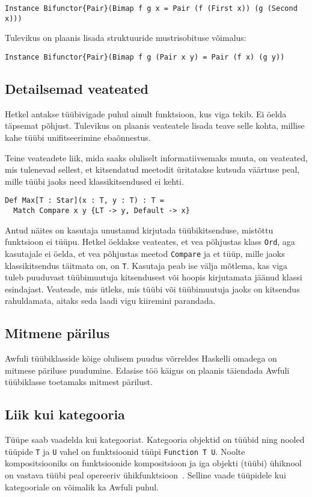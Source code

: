 \documentclass[12pt]{article}
\begin{document}
      \begin{verbatim}Instance Bifunctor{Pair}(Bimap f g x = Pair (f (First x)) (g (Second x)))\end{verbatim}

      Tulevikus on plaanis lisada struktuuride mustrisobituse võimalus:

      \begin{verbatim}Instance Bifunctor{Pair}(Bimap f g (Pair x y) = Pair (f x) (g y))\end{verbatim}
    \subsection{Detailsemad veateated}
      Hetkel antakse tüübivigade puhul ainult funktsioon, kus viga tekib. Ei öelda täpsemat põhjust. Tulevikus on plaanis veateatele lisada teave selle kohta, millise kahe tüübi unifitseerimine ebaõnnestus.

      Teine veateadete liik, mida saaks oluliselt informatiivsemaks muuta, on veateated, mis tulenevad sellest, et kitsendatud meetodit üritatakse kutsuda väärtuse peal, mille tüübi jaoks need klassikitsendused ei kehti.

      \begin{verbatim}Def Max[T : Star](x : T, y : T) : T =
  Match Compare x y {LT -> y, Default -> x}\end{verbatim}

      Antud näites on kasutaja unustanud kirjutada tüübikitsenduse, mistõttu funktsioon ei tüüpu. Hetkel öeldakse veateates, et vea põhjustas klass \verb!Ord!, aga kasutajale ei öelda, et vea põhjustas meetod \verb!Compare! ja et tüüp, mille jaoks klassikitsendus täitmata on, on \verb!T!. Kasutaja peab ise välja mõtlema, kas viga tuleb puuduvast tüübimuutuja kitsendusest või hoopis kirjutamata jäänud klassi esindajast. Veateade, mis ütleks, mis tüübi või tüübimuutuja jaoks on kitsendus rahuldamata, aitaks seda laadi vigu kiiremini parandada.
    \subsection{Mitmene pärilus}
      Awfuli tüübiklasside kõige olulisem puudus võrreldes Haskelli omadega on mitmese päriluse puudumine. Edasise töö käigus on plaanis täiendada Awfuli tüübiklasse toetamaks mitmest pärilust.
    \subsection{Liik kui kategooria}
      Tüüpe saab vaadelda kui kategooriat. Kategooria objektid on tüübid ning nooled tüüpide \verb!T! ja \verb!U! vahel on funktsioonid tüüpi \verb!Function T U!. Noolte kompositsiooniks on funktsioonide kompositsioon ja iga objekti (tüübi) ühiknool on vastava tüübi peal opereeriv ühikfunktsioon~\cite{Car, Fas}. Selline vaade tüüpidele kui kategooriale on võimalik ka Awfuli puhul.
\end{document}
